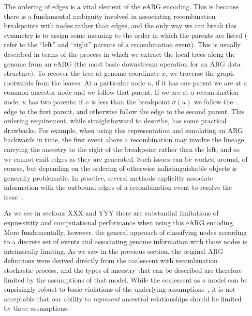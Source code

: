 \documentclass{article}
\begin{document}
The ordering of edges is a vital element of the eARG encoding.
This is because there is a fundamental ambiguity involved
in associating recombination breakpoints with nodes
rather than edges,
and the only way we can break this symmetry is to assign
some meaning to the order in which the parents are listed
(\cite{griffiths1997ancestral} refer to the ``left'' and ``right''
parents of a recombination event). This is usually described
in terms of the process in which we extract the local trees
along the genome from an eARG (the most basic downstream
operation for an ARG data structure).
To recover the tree at genome coordinate $x$,
we traverse the graph rootwards from the leaves.
At a particular
node $u$, if it has one parent we are at a common ancestor
node and we follow that parent. If we are at a
recombination node, $u$ has two parents: if
$x$ is less than the breakpoint $\sigma(u)$ we follow
the edge to the first parent, and otherwise follow the edge
to the second parent.
This ordering requirement, while straightforward
to describe, has some practical drawbacks. For example,
when using this representation and simulating an ARG backwards in time,
the first event above a recombination may involve the lineage carrying the
ancestry to the right of the breakpoint rather
than the left, and so we cannot emit edges as they are generated.
Such issues can be worked around, of course, but depending on the ordering of
otherwise indistinguishable objects is generally problematic. In practice,
several methods explicitly associate information with the outbound edges
of a recombination event
to resolve the issue~\citep{lyngso2005minimum,ignatieva2021kwarg}.

As we see in sections XXX and YYY there are substantial limitations
of expressivity and computational performance when using this eARG
encoding. More fundamentally, however, the general approach
of classifying nodes according to a discrete set of events
and associating genome information with those nodes is intrinsically
limiting. As we saw in the previous section, the original ARG
definitions were derived directly from the coalescent with recombination
stochastic process, and the types of ancestry that can be
described are therefore limited by the assumptions of that
model. While the coalescent as a model can be suprisingly robust to
basic violations of the underlying assumptions~\citep{
wakeley2012gene,bhaskar2014distortion,nelson2020accounting},
it is not acceptable that our ability to \emph{represent}
ancestral relationships should be limited by these assumptions.
\end{document}
